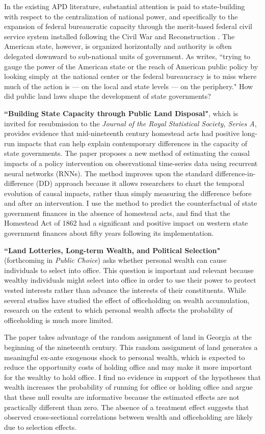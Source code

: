 \documentclass[12pt,letterpaper]{article}
\begin{document}
\begin{small}
In the existing APD literature, substantial attention is paid to state-building with respect to the centralization of national power, and specifically to the expansion of federal bureaucratic capacity through the merit-based federal civil service system installed following the Civil War and Reconstruction \citep{skowronek1982building,bensel1990,carpenter2001}. The American state, however, is organized horizontally and authority is often delegated downward to sub-national units of government. As \citet{novak2008myth} writes, ``trying to gauge the power of the American state or the reach of American public policy by looking simply at the national center or the federal bureaucracy is to miss where much of the action is --- on the local and state levels --- on the periphery." How did public land laws shape the development of state governments? 

\textbf{``Building State Capacity through Public Land Disposal"}, which is invited for resubmission to the \emph{Journal of the Royal Statistical Society, Series A}, provides evidence that mid-nineteenth century homestead acts had positive long-run impacts that can help explain contemporary differences in the capacity of state governments. The paper proposes a new method of estimating the causal impacts of a policy intervention on observational time-series data using recurrent neural networks (RNNs). The method improves upon the standard difference-in-difference (DD) approach because it allows researchers to chart the temporal evolution of causal impacts, rather than simply measuring the difference before and after an intervention. I use the method to predict the counterfactual of state government finances in the absence of homestead acts, and find that the Homestead Act of 1862 had a significant and positive impact on western state government finances about fifty years following its implementation. 

\textbf{``Land Lotteries, Long-term Wealth, and Political Selection"} (forthcoming in \emph{Public Choice}) asks whether personal wealth can cause individuals to select into office. This question is important and relevant because wealthy individuals might select into office in order to use their power to protect vested interests rather than advance the interests of their constituents. While several studies have studied the effect of officeholding on wealth accumulation, research on the extent to which personal wealth affects the probability of officeholding is much more limited.

The paper takes advantage of the random assignment of land in Georgia at the beginning of the nineteenth century. This random assignment of land generates a meaningful ex-ante exogenous shock to personal wealth, which is expected to reduce the opportunity costs of holding office and may make it more important for the wealthy to hold office. I find no evidence in support of the hypotheses that wealth increases the probability of running for office or holding office and argue that these null results are informative because the estimated effects are not practically different than zero. The absence of a treatment effect suggests that observed cross-sectional correlations between wealth and officeholding are likely due to selection effects. 


\end{small}
\end{document}
